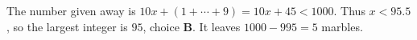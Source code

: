 The number given away is $10x+(1+\cdots+9)=10x+45<1000$. Thus $x<95.5$, so the largest integer is $\boxed{95}$, choice \textbf{B}. It leaves $1000-995=5$ marbles.
